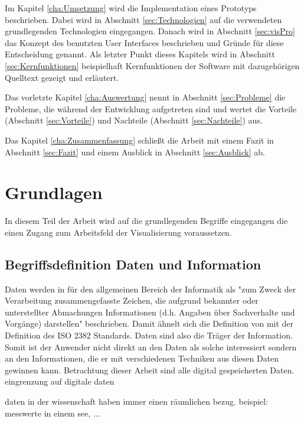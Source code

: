 \documentclass[a4paper, 12pt, DIVcalc, onepage, pdftex, headsepline, footsepline]{scrreprt}
\begin{document}
Im Kapitel \ref{cha:Umsetzung} wird die Implementation eines Prototyps beschrieben. Dabei wird in Abschnitt
\ref{sec:Technologien} auf die verwendeten grundlegenden Technologien eingegangen. Danach wird in Abschnitt
\ref{sec:visPro} das Konzept des benutzten User Interfaces beschrieben und Gründe für diese Entscheidung genannt.
Als letzter Punkt dieses Kapitels wird in Abschnitt \ref{sec:Kernfunktionen} beispielhaft Kernfunktionen
der Software mit dazugehörigen Quelltext gezeigt und erläutert.

Das vorletzte Kapitel \ref{cha:Auswertung} nennt in Abschnitt \ref{sec:Probleme} die Probleme, die während
der Entwicklung aufgetreten sind und wertet die Vorteile (Abschnitt \ref{sec:Vorteile}) und Nachteile
(Abschnitt \ref{sec:Nachteile}) aus.

Das Kapitel \ref{cha:Zusammenfassung} schließt die Arbeit mit einem Fazit in Abschnitt \ref{sec:Fazit} und
einem Ausblick in Abschnitt \ref{sec:Ausblick} ab.

\chapter{Grundlagen}
\label{cha:Grundlagen}
In diesem Teil der Arbeit wird auf die grundlegenden Begriffe eingegangen die einen Zugang
zum Arbeitsfeld der Visualisierung voraussetzen.
\section{Begriffsdefinition Daten und Information}
\label{sec:DatenInfo}
Daten werden in \cite{Gabler} für den allgemeinen Bereich der Informatik als "zum Zweck der Verarbeitung
zusammengefasste Zeichen, die aufgrund bekannter oder unterstellter Abmachungen Informationen
(d.h. Angaben über Sachverhalte und Vorgänge) darstellen" 
beschrieben.
Damit ähnelt sich die Definition von \cite{Gabler} mit der Definition des ISO 2382 Standards. 
Daten sind also die Träger der Information. Somit ist der Anwender nicht direkt an den Daten
als solche interessiert sondern an den Informationen, die er mit verschiedenen Techniken aus
diesen Daten gewinnen kann.
Betrachtung dieser Arbeit sind alle digital gespeicherten Daten.
eingrenzung auf digitale daten

daten in der wissenschaft haben immer einen räumlichen bezug. beispiel: messwerte in einem see, ...
\end{document}
